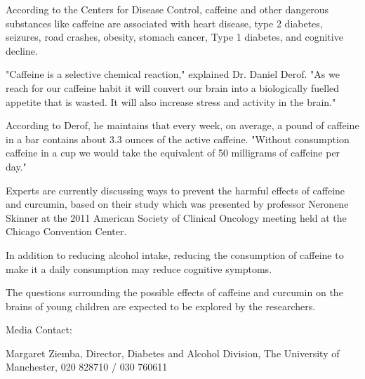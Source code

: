 \documentclass{article}
\begin{document}
According to the Centers for Disease Control, caffeine and other dangerous substances like caffeine are associated with heart disease, type 2 diabetes, seizures, road crashes, obesity, stomach cancer, Type 1 diabetes, and cognitive decline.

"Caffeine is a selective chemical reaction," explained Dr. Daniel Derof. "As we reach for our caffeine habit it will convert our brain into a biologically fuelled appetite that is wasted. It will also increase stress and activity in the brain."

According to Derof, he maintains that every week, on average, a pound of caffeine in a bar contains about 3.3 ounces of the active caffeine. "Without consumption caffeine in a cup we would take the equivalent of 50 milligrams of caffeine per day."

Experts are currently discussing ways to prevent the harmful effects of caffeine and curcumin, based on their study which was presented by professor Neronene Skinner at the 2011 American Society of Clinical Oncology meeting held at the Chicago Convention Center.

In addition to reducing alcohol intake, reducing the consumption of caffeine to make it a daily consumption may reduce cognitive symptoms.

The questions surrounding the possible effects of caffeine and curcumin on the brains of young children are expected to be explored by the researchers.

Media Contact:

Margaret Ziemba, Director, Diabetes and Alcohol Division, The University of Manchester, 020 828710 / 030 760611
\end{document}
